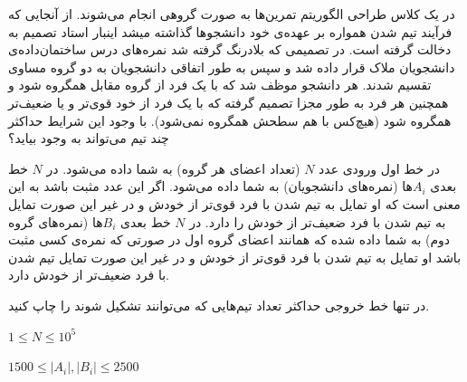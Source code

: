 \documentclass[11.5pt,a4paper,oneside]{article}
\begin{document}
\def\problemCode{Realtime}
\def\problemEnglishTitle{Realtime Teammate}
\def\problemFarsiTitle{همگروهی بلادرنگ}
\def\timeLimit{$1$ \second}
\def\memLimit{$32$ \megabytes}
\begin{problem}
در یک کلاس طراحی الگوریتم تمرین‌ها به صورت گروهی انجام می‌شوند. از آنجایی که فرآیند تیم شدن همواره بر عهده‌ی خود دانشجو‌ها گذاشته میشد اینبار استاد تصمیم به دخالت گرفته است. در تصمیمی که بلادرنگ گرفته شد نمره‌های درس ساختمان‌داده‌ی دانشجویان ملاک قرار داده شد و سپس به طور اتفاقی دانشجویان به دو گروه مساوی تقسیم شدند. هر دانشجو موظف شد که با یک فرد از گروه مقابل همگروه شود و همچنین هر فرد به طور مجزا تصمیم گرفته که با یک فرد از خود قوی‌تر و یا ضعیف‌تر همگروه شود (هیچ‌کس با هم سطحش همگروه نمی‌شود). با وجود این شرایط حداکثر چند تیم می‌تواند به وجود بیاید؟

در خط اول ورودی عدد $N$ (تعداد اعضای هر گروه) به شما داده می‌شود. 
در $N$ خط بعدی $A_i$ها (نمره‌های دانشجویان) به شما داده می‌شود. اگر این عدد مثبت باشد به این معنی است که او تمایل به تیم شدن با فرد قوی‌تر از خودش و در غیر این صورت تمایل به تیم شدن با فرد ضعیف‌تر از خودش را دارد. در $N$ خط بعدی  $B_i$ها (نمره‌های گروه دوم) به شما داده شده که همانند اعضای گروه اول در صورتی که نمره‌ی کسی مثبت باشد او تمایل به تیم شدن با فرد قوی‌تر از خودش و در غیر این صورت تمایل تیم شدن با فرد ضعیف‌تر از خودش دارد.

\outputDescription
در تنها خط خروجی حداکثر تعداد تیم‌هایی که می‌توانند تشکیل شوند را چاپ کنید.
\constraints
\begin{shortitems}
\item $1 \le N \le 10^5$
\item $1500 \le |A_i|, |B_i| \le 2500$
\end{shortitems}

\sampleIO

\begin{example}
%
%
%
\end{example}



\end{problem}
\end{document}
